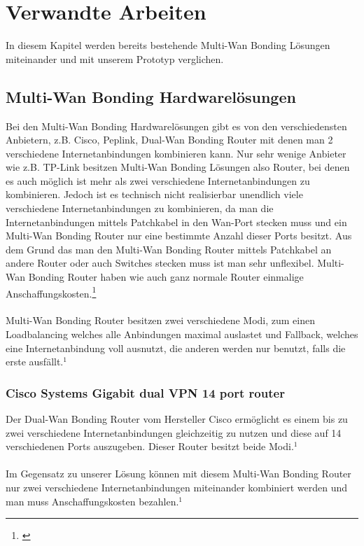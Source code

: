 \chapter{Verwandte Arbeiten}
\label{chap:VerwandteArbeiten}
In diesem Kapitel werden bereits bestehende Multi-Wan Bonding Lösungen miteinander und mit unserem Prototyp verglichen.  


\section{Multi-Wan Bonding Hardwarelösungen}
Bei den Multi-Wan Bonding Hardwarelösungen gibt es von den verschiedensten Anbietern, z.B. Cisco, Peplink, Dual-Wan Bonding Router mit denen man 2 verschiedene Internetanbindungen kombinieren kann. Nur sehr wenige Anbieter wie z.B. TP-Link besitzen Multi-Wan Bonding Lösungen also Router, bei denen es auch möglich ist mehr als zwei verschiedene Internetanbindungen zu kombinieren. Jedoch ist es technisch nicht realisierbar unendlich viele verschiedene Internetanbindungen zu kombinieren, da man die Internetanbindungen mittels Patchkabel in den Wan-Port stecken muss und ein Multi-Wan Bonding Router nur eine bestimmte Anzahl dieser Ports besitzt. Aus dem Grund das man den Multi-Wan Bonding Router mittels Patchkabel an andere Router oder auch Switches stecken muss ist man sehr unflexibel. Multi-Wan Bonding Router haben wie auch ganz normale Router einmalige Anschaffungskosten.\footnote[1]{\cite[Vgl.][]{5}}
\\\\
Multi-Wan Bonding Router besitzen zwei verschiedene Modi, zum einen Loadbalancing welches alle Anbindungen maximal auslastet und Fallback, welches eine Internetanbindung voll ausnutzt, die anderen werden nur benutzt, falls die erste ausfällt.$^{1}$ 


\subsection{Cisco Systems Gigabit dual VPN 14 port router}
Der Dual-Wan Bonding Router vom Hersteller Cisco ermöglicht es einem bis zu zwei verschiedene Internetanbindungen gleichzeitig zu nutzen und diese auf 14 verschiedenen Ports auszugeben. Dieser Router besitzt beide Modi.$^{1}$
\\\\
Im Gegensatz zu unserer Lösung können mit diesem Multi-Wan Bonding Router nur zwei verschiedene Internetanbindungen miteinander kombiniert werden und man muss Anschaffungskosten bezahlen.$^{1}$ 

